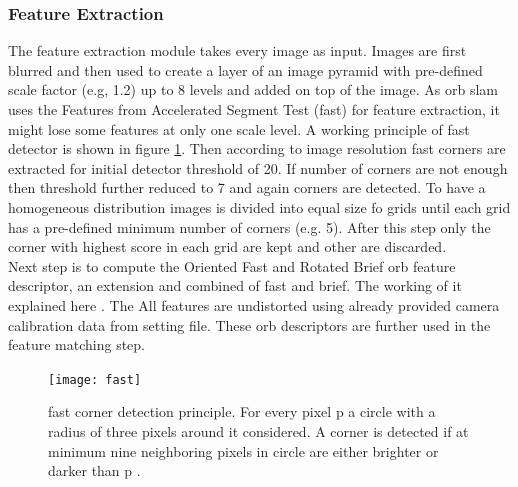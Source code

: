 \subsubsection{Feature Extraction}
The feature extraction module takes every image as input. Images are first blurred and then used to create a layer of an image pyramid with pre-defined scale factor (e.g, 1.2) up to 8 levels and added on top of the image. As \acrshort{orb} \acrshort{slam} uses the Features from Accelerated Segment Test (\acrshort{fast}) for feature extraction, it might lose some features at only one scale level. A working principle of \acrshort{fast} detector is shown in figure \ref{fig:fast}. Then according to image resolution \acrshort{fast} corners are extracted for initial detector threshold of 20. If number of corners are not enough then threshold further reduced to 7 and again corners are detected. To have a homogeneous distribution images is divided into equal size fo grids until each grid has a pre-defined minimum number of corners (e.g. 5). After this step only the corner with highest score in each grid are kept and other are discarded. \\
\linebreak
Next step is to compute the Oriented Fast and Rotated Brief \acrshort{orb} feature descriptor, an extension and combined of \acrshort{fast} and \acrshort{brief}. The working of it explained here \cite{ORB}. The All features are undistorted using already provided camera calibration data from setting file. These \acrshort{orb} descriptors are further used in the feature matching step.
\begin{figure}[h]
	\centering
	\texttt{[image: fast]}
	\caption{\acrshort{fast} corner detection principle. For every pixel {p} a circle with
		a radius of three pixels around it considered. A corner is detected if at minimum nine neighboring pixels in circle are either brighter or darker than {p} \cite{fast}.}
	\label{fig:fast}
\end{figure}

